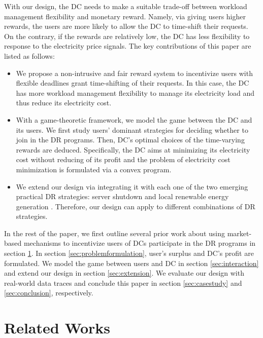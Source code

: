 \documentclass[conference]{IEEEtran}
\begin{document}
With our design, the DC needs to make a suitable trade-off between workload management flexibility and monetary reward. Namely, via giving users higher rewards, the  users are more likely to allow the DC to time-shift their requests. On the contrary, if the rewards are relatively low, the DC has less flexibility to response to the electricity price signals.  
The key contributions of this paper are listed as follows:
\begin{itemize}
\item We propose a non-intrusive and fair reward system to incentivize users  with flexible deadlines grant time-shifting of their requests. In this case, the DC has more workload management flexibility to manage its electricity load and thus reduce its electricity cost. 

\item With a game-theoretic framework, we model the game between the DC and its users. We first study users' dominant strategies for deciding whether to join in the DR programs. Then, DC's optimal choices of the time-varying rewards are deduced. Specifically, the DC aims at minimizing its electricity cost without reducing of its profit and the problem of electricity cost minimization is formulated via a convex program.

\item We extend our design via integrating it with each one of the two emerging practical DR strategies: server shutdown \cite{Zhan2016,Paul2015,Li2015} and local renewable energy generation \cite{Zhan2015,Deng2014,Ghamkhari2013}. Therefore, our design can apply to different combinations of DR strategies.
\end{itemize}


In the rest of the paper, we first outline several prior work about using market-based mechanisms to incentivize users of DCs participate in the DR programs in section \ref{sec:relatedworks}. In section \ref{sec:problemformulation}, user's surplus and DC's profit are formulated. We model the game between users and DC in section \ref{sec:interaction} and extend our design in section \ref{sec:extension}. We evaluate our design with real-world data traces and conclude this paper in section \ref{sec:casestudy} and \ref{sec:conclusion}, respectively.


\section{Related Works}\label{sec:relatedworks}
\end{document}
